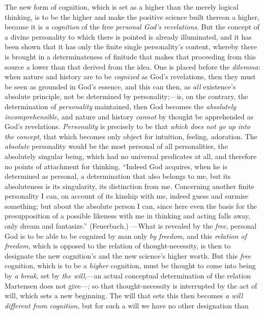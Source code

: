\documentclass[12pt,a4paper]{book}
\begin{document}
The new form of cognition, which is set as a higher than the merely logical thinking, is to be
the higher and make the positive science built thereon a higher, because it is \emph{a
cognition} of the free \emph{personal God's revelations}. But the concept of a divine personality to
which there is pointed is already illuminated, and it has been shown that it has only the finite
single personality's content, whereby there is brought in a determinateness of finitude that
makes that proceeding from this source a lower than that derived from the idea. One is placed
before the \emph{dilemma}: when nature and history are to be \emph{cognized} as God's revelations, then
they must be seen as grounded in God's essence, and this can then, as \emph{all} existence's absolute
principle, not be determined by personality;---is, on the contrary, the determination of
\emph{personality} maintained, then God becomes the \emph{absolutely incomprehensible}, and nature and
history \emph{cannot} by thought be apprehended as God's revelations. \emph{Personality} is precisely to
be that \emph{which does not go up into the concept}, that which becomes only object for intuition,
feeling, adoration. The \emph{absolute} personality would be the most personal of all
personalities, the absolutely singular being, which had no universal predicates at all, and
therefore no points of attachment for thinking. ``Indeed God acquires, when he is determined as
personal, a determination that also belongs to me, but its absoluteness is its singularity, its
distinction from me. Concerning another finite personality I can, on account of its kinship with
me, indeed guess and surmise something; but about the absolute person I can, since here even the
basis for the presupposition of a possible likeness with me in thinking and acting falls away,
only dream and fantasize.'' (Feuerbach.) ---What is revealed by the \emph{free}, personal God is to be
able to be cognized by man only \emph{by freedom}, and this \emph{relation of freedom}, which is
opposed to the relation of thought-necessity, is then to designate the new cognition's
and the new science's higher worth. But this \emph{free} cognition, which is to be a \emph{higher} cognition,
must be thought to come into being by \emph{a break}, set by \emph{the will},---an actual conceptual
determination of the relation Martensen does not give---; so that thought-necessity is
interrupted by the act of will, which sets a new beginning. The will that sets this then
becomes \emph{a will different from cognition}, but for such a will we have no other designation than
\end{document}
